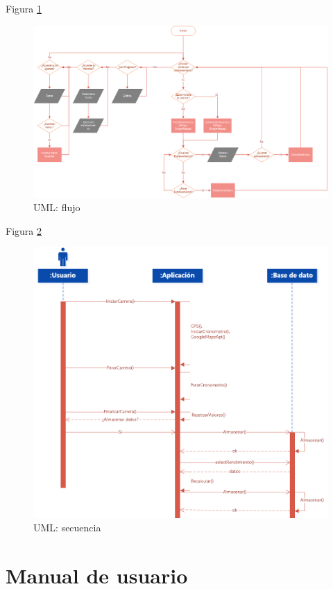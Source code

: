 \documentclass[a4paper, 11pt]{article}
\begin{document}
\begin{itemize}
  Figura \ref{f:uml-flujo}
          \begin{figure}[H]
            \centering
            \includegraphics[width=1\textwidth]{UML-diagramaalgo}
            \caption{UML: flujo}
            \label{f:uml-flujo}
          \end{figure}
  Figura \ref{f:uml-secuencia}
          \begin{figure}[H]
            \centering
            \includegraphics[width=1\textwidth]{UML-diagramasecuencia}
            \caption{UML: secuencia}
            \label{f:uml-secuencia}
          \end{figure}

\section{Manual de usuario}


\end{itemize}
\end{document}
